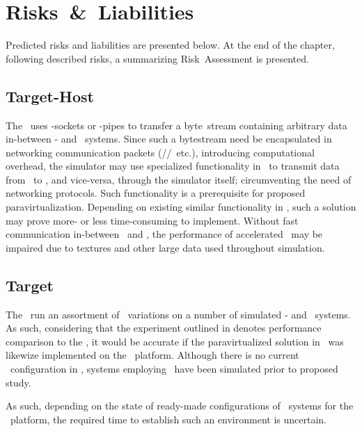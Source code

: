 
\chapter{Risks~\&~Liabilities}
\label{cha:risksandliabilities}
Predicted risks and liabilities are presented below.
At the end of the chapter, following described risks, a summarizing Risk~Assessment is presented.

\section{Target-Host~\termrw}
\label{sec:risksandliabilities_targethostrw}
The \termrefsolu\ uses \termunix -sockets or \termwinthirtytwo -pipes to transfer a byte~stream containing arbitrary data in-between  \termtarget - and \termhost\ systems.
Since such a bytestream need be encapsulated in networking communication packets (\termtcp /\termip /\termmac\ etc.), introducing computational overhead, the simulator may use specialized functionality in \termqemu\ to transmit data from \termtarget\ to \termhost , and vice-versa, through the simulator itself; circumventing the need of networking protocols.
Such functionality is a prerequisite for proposed paravirtualization.
Depending on existing similar functionality in \termsimics , such a solution may prove more- or less time-consuming to implement.
Without fast communication in-between \termhost\ and \termtarget , the performance of accelerated \termopengles\ may be impaired due to textures and other large data used throughout simulation.

\section{Target~\termos }
\label{sec:risksandliabilities_targetos}
The \termrefsolu\ run an assortment of \termandroid\ variations on a number of simulated \termarm - and \termxeightysix\ systems.
As such, considering that the experiment outlined in  denotes performance comparison to the \termrefsolu , it would be accurate if the paravirtualized solution in \termsimics\ was likewize implemented on the \termandroid\ platform.
Although there is no current \termandroid\ configuration in \termsimics , systems employing \termandroid\ have been simulated prior to proposed study.

As such, depending on the state of ready-made configurations of \termandroid\ systems for the \termsimics\ platform, the required time to establish such an environment is uncertain.

